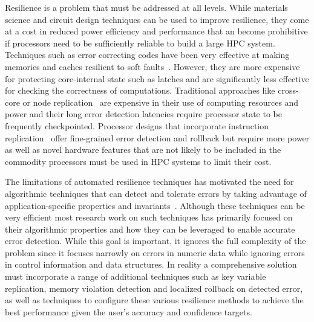 \documentclass{sig-alternate}
\begin{document}
Resilience is a problem that must be addressed at all levels.
While materials science and circuit design techniques can be used to improve resilience, they come at a cost in reduced power efficiency and performance that an become prohibitive if processors need to be sufficiently reliable to build a large HPC system.
Techniques such as error correcting codes have been very effective at making memories and caches resilient to soft faults~\cite{mem_errors:2010}.
However, they are more expensive for protecting core-internal state such as latches and are significantly less effective for checking the correctness of computations.
Traditional approaches like cross-core or node replication~\cite{rmpi:2011, dyn_cmp_repl:2007} are expensive in their use of computing resources and power and their long error detection latencies require processor state to be frequently checkpointed.
Processor designs that incorporate instruction replication~\cite{repl_smt:2000} offer fine-grained error detection and rollback but require more power as well as novel hardware features that are not likely to be included in the commodity processors must be used in HPC systems to limit their cost.

The limitations of automated resilience techniques has motivated the need for algorithmic techniques that can detect and tolerate errors by taking advantage of application-specific properties and invariants~\cite{amg_abft:2012, robustification:2010, abft:1984}.
Although these techniques can be very efficient most research work on such techniques has primarily focused on their algorithmic properties and how they can be leveraged to enable accurate error detection.
While this goal is important, it ignores the full complexity of the problem since it focuses narrowly on errors in numeric data while ignoring errors in control information and data structures.
In reality a comprehensive solution must incorporate a range of additional techniques such as key variable replication, memory violation detection and localized rollback on detected error, as well as techniques to configure these various resilience methods to achieve the best performance given the user's accuracy and confidence targets.
\end{document}
